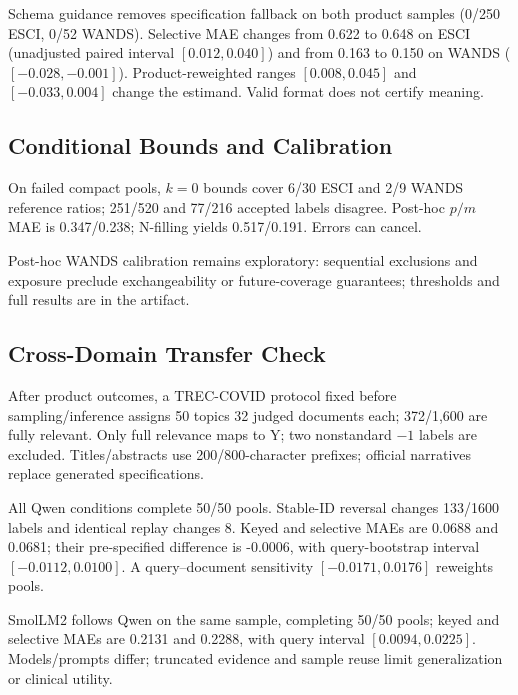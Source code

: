 \documentclass[conference]{IEEEtran}
\begin{document}
Schema guidance removes specification fallback on both product samples (0/250 ESCI, 0/52 WANDS). Selective MAE changes from 0.622 to 0.648 on ESCI (unadjusted paired interval $[0.012,0.040]$) and from 0.163 to 0.150 on WANDS ($[-0.028,-0.001]$). Product-reweighted ranges $[0.008,0.045]$ and $[-0.033,0.004]$ change the estimand. Valid format does not certify meaning.

\subsection{Conditional Bounds and Calibration}
On failed compact pools, $k=0$ bounds cover 6/30 ESCI and 2/9 WANDS reference ratios; 251/520 and 77/216 accepted labels disagree. Post-hoc $p/m$ MAE is 0.347/0.238; N-filling yields 0.517/0.191. Errors can cancel.

Post-hoc WANDS calibration remains exploratory: sequential exclusions and exposure preclude exchangeability or future-coverage guarantees; thresholds and full results are in the artifact.

\subsection{Cross-Domain Transfer Check}
After product outcomes, a TREC-COVID protocol \cite{treccovid} fixed before sampling/inference assigns 50 topics 32 judged documents each; 372/1,600 are fully relevant. Only full relevance maps to Y; two nonstandard $-1$ labels are excluded. Titles/abstracts use 200/800-character prefixes; official narratives replace generated specifications.

All Qwen conditions complete 50/50 pools. Stable-ID reversal changes 133/1600 labels and identical replay changes 8. Keyed and selective MAEs are 0.0688 and 0.0681; their pre-specified difference is -0.0006, with query-bootstrap interval $[-0.0112,0.0100]$. A query--document sensitivity $[-0.0171,0.0176]$ reweights pools.

SmolLM2 follows Qwen on the same sample, completing 50/50 pools; keyed and selective MAEs are 0.2131 and 0.2288, with query interval $[0.0094,0.0225]$. Models/prompts differ; truncated evidence and sample reuse limit generalization or clinical utility.
\end{document}
